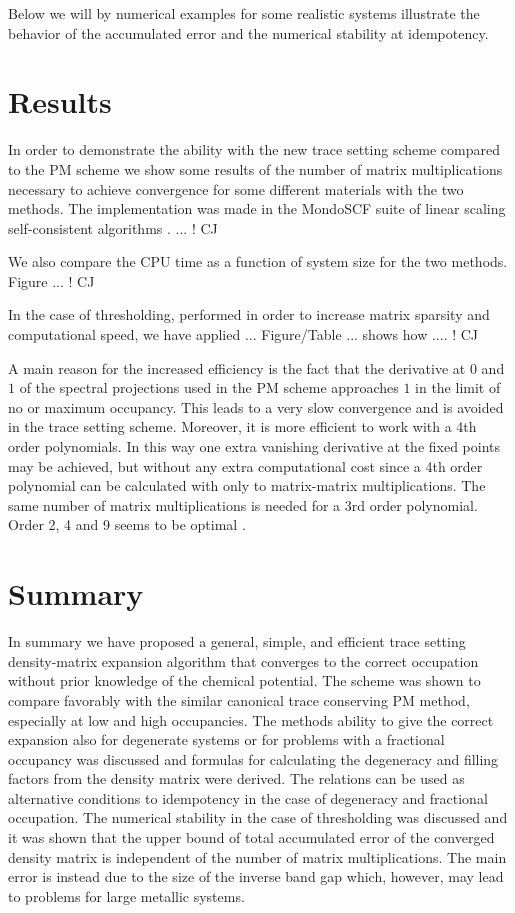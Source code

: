 \commentoutA{\documentclass[superbib,aps,prb,epsfig,floats,twocolumn]{revtex4}}
\begin{document}
Below we will by numerical examples for some realistic systems illustrate
the behavior of the accumulated error and the numerical stability at idempotency.


\section{Results}

In order to demonstrate the ability with the new trace setting scheme 
compared to the PM scheme we show some results of the number of matrix
multiplications necessary to achieve convergence for some different 
materials with the two methods. The implementation was made in
the MondoSCF suite of linear scaling self-consistent algorithms
\cite{Mondo}. ... ! CJ

We also compare the CPU time as a function of system size for
the two methods. Figure ... ! CJ

In the case of thresholding, performed in order to increase
matrix sparsity and computational speed, we have applied ...
Figure/Table ... shows how .... ! CJ

A main reason for the increased efficiency is the fact that
the derivative at $0$ and $1$ of the spectral projections used
in the PM scheme approaches $1$ in the limit of no or maximum
occupancy. This leads to a very slow convergence and is avoided
in the trace setting scheme. Moreover, it is more efficient to 
work with a 4th order polynomials. In this way one extra vanishing
derivative at the fixed points may be achieved, but without any
extra computational cost since a 4th order polynomial can be
calculated with only to matrix-matrix multiplications. The
same number of matrix multiplications is needed for a 3rd
order polynomial. Order 2, 4 and 9 seems to be optimal \cite{Niklasson02}.


\section{Summary}

In summary we have proposed a general, simple, and efficient 
trace setting density-matrix expansion algorithm that converges 
to the correct occupation without prior knowledge of the chemical
potential. The scheme was shown to compare favorably with the
similar canonical trace conserving PM method, especially at
low and high occupancies. The methods ability to give the
correct expansion also for degenerate systems or for problems
with a fractional occupancy was discussed
and formulas for calculating the degeneracy and filling factors
from the density matrix were derived. The relations can
be used as alternative conditions to idempotency in the
case of degeneracy and fractional occupation.
The numerical stability in the case of thresholding
was discussed and it was shown that the upper bound of 
total accumulated error of the converged density matrix is independent
of the number of matrix multiplications. The main error 
is instead due to the size of the inverse band gap which, however,
may lead to problems for large metallic systems.
\end{document}
